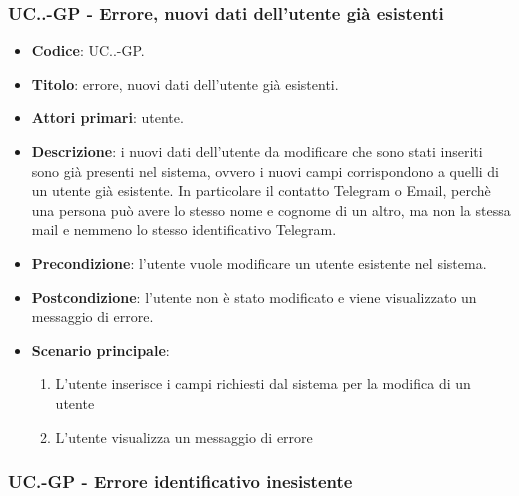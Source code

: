 		\subsubsection{UC\theuccount.\thesubuccount.\thesubsubuccount-GP - Errore, nuovi dati dell'utente già esistenti}
		
		\begin{itemize}
			\item \textbf{Codice}: UC\theuccount.\thesubuccount.\thesubsubuccount-GP.
			\item \textbf{Titolo}: errore, nuovi dati dell'utente già esistenti.
			\item \textbf{Attori primari}: utente.
			\item \textbf{Descrizione}: i nuovi dati dell'utente da modificare che sono stati inseriti sono già presenti nel sistema, ovvero i nuovi campi corrispondono a quelli di un utente già esistente. In particolare il contatto Telegram o Email, perchè una persona può avere lo stesso nome e cognome di un altro, ma non la stessa mail e nemmeno lo stesso identificativo Telegram.
			\item \textbf{Precondizione}: l'utente vuole modificare un utente esistente nel sistema.
			\item \textbf{Postcondizione}: l'utente non è stato modificato e viene visualizzato un messaggio di errore.
			\item \textbf{Scenario principale}:
			\begin{enumerate}
				\item L'utente inserisce i campi richiesti dal sistema per la modifica di un utente
				\item L'utente visualizza un messaggio di errore
			\end{enumerate}
		\end{itemize}
	\subsubsection{UC\theuccount.\thesubuccount-GP - Errore identificativo inesistente}
		
